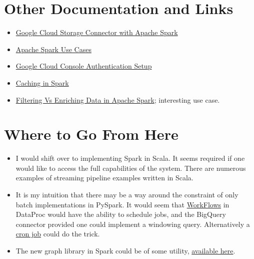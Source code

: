 \documentclass[english]{article}
\begin{document}
\section{Other Documentation and Links}
\begin{itemize}
\item \href{https://cloud.google.com/dataproc/docs/tutorials/gcs-connector-spark-tutorial}{Google Cloud Storage Connector with Apache Spark}
\item \href{https://www.qubole.com/blog/apache-spark-use-cases/}{Apache Spark Use Cases}
\item \href{https://cloud.google.com/docs/authentication/getting-started}{Google Cloud Console Authentication Setup}
\item \href{https://jaceklaskowski.gitbooks.io/mastering-apache-spark/spark-rdd-caching.html}{Caching in Spark}
\item \href{https://medium.com/capital-one-tech/filtering-vs-enriching-data-in-apache-spark-e44108c3a372}{Filtering Vs Enriching Data in Apache Spark}; interesting use case.
\end{itemize}
\section{Where to Go From Here}
\begin{itemize}
\item I would shift over to implementing Spark in Scala. It seems required if one would like to access the full capabilities of the system. There are numerous examples of streaming pipeline examples written in Scala.
\item It is my intuition that there may be a way around the constraint of only batch implementations in PySpark. It would seem that \href{https://cloud.google.com/dataproc/docs/concepts/workflows/overview}{WorkFlows} in DataProc would have the ability to schedule jobs, and the BigQuery connector provided one could implement a windowing query. Alternatively a \href{https://stackoverflow.com/questions/30375571/running-scheduled-spark-job}{cron job} could do the trick.
\item The new graph library in Spark could be of some utility, \href{https://spark.apache.org/docs/latest/graphx-programming-guide.html}{available here}.
\end{itemize}
\end{document}
